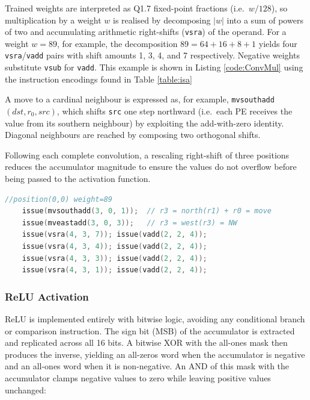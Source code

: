         Trained weights are interpreted as Q1.7 fixed-point fractions (i.e.\ $w/128$), so multiplication by a weight $w$ is realised by decomposing $|w|$ into a sum of powers of two and accumulating arithmetic right-shifts (\texttt{vsra}) of the operand. For a weight $w = 89$, for example, the decomposition $89 = 64 + 16 + 8 + 1$ yields four \texttt{vsra}/\texttt{vadd} pairs with shift amounts 1, 3, 4, and 7 respectively. Negative weights substitute \texttt{vsub} for \texttt{vadd}. This example is shown in Listing \ref{code:ConvMul} using the instruction encodings found in Table \ref{table:isa}
        
        A move to a cardinal neighbour is expressed as, for example,
        \texttt{mvsouthadd}$(dst, r_0, src)$, which shifts \texttt{src} one step northward (i.e.\ each PE receives the value from its southern neighbour) by exploiting the add-with-zero identity. Diagonal neighbours are reached by composing two orthogonal shifts. %
        
        Following each complete convolution, a rescaling right-shift of three positions reduces the accumulator magnitude to ensure the values do not overflow before being passed to the activation function.

    \begin{lstlisting}[language=C, 
        caption={Example of multiplication by the (0,0) weight}, 
        label={code:ConvMul},basicstyle=\footnotesize\ttfamily,
        aboveskip=2pt,
        belowskip=2pt,
        xleftmargin=0pt,
        framexleftmargin=0pt]
    //position(0,0) weight=89
    issue(mvsouthadd(3, 0, 1));  // r3 = north(r1) + r0 = move
    issue(mveastadd(3, 0, 3));   // r3 = west(r3) = NW
    issue(vsra(4, 3, 7)); issue(vadd(2, 2, 4));
    issue(vsra(4, 3, 4)); issue(vadd(2, 2, 4));
    issue(vsra(4, 3, 3)); issue(vadd(2, 2, 4));
    issue(vsra(4, 3, 1)); issue(vadd(2, 2, 4));\end{lstlisting}

        \subsubsection{ReLU Activation}
        ReLU is implemented entirely with bitwise logic, avoiding any conditional branch or comparison instruction. The sign bit (MSB) of the accumulator is extracted and replicated across all 16 bits. A bitwise XOR with the all-ones mask then produces the inverse, yielding an all-zeros word when the accumulator is negative and an all-ones word when it is non-negative. An AND of this mask with the accumulator clamps negative values to zero while leaving positive values
        unchanged:
        
